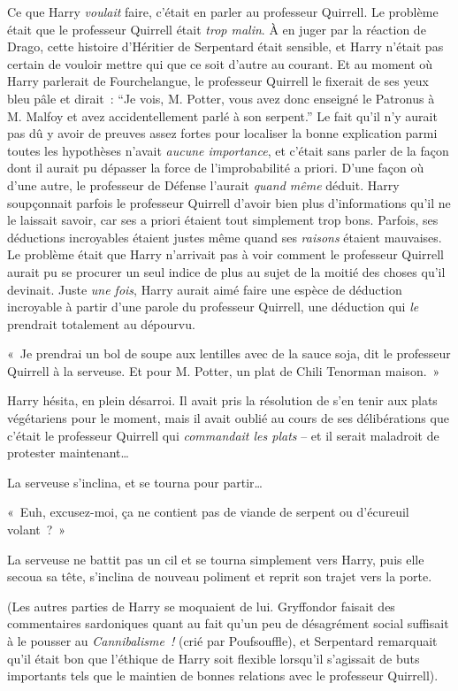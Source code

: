 Ce que Harry \emph{voulait} faire, c'était en parler au professeur Quirrell. Le problème était que le professeur Quirrell était \emph{trop malin}. À en juger par la réaction de Drago, cette histoire d'Héritier de Serpentard était sensible, et Harry n'était pas certain de vouloir mettre qui que ce soit d'autre au courant. Et au moment où Harry parlerait de Fourchelangue, le professeur Quirrell le fixerait de ses yeux bleu pâle et dirait~: “Je vois, M. Potter, vous avez donc enseigné le Patronus à M. Malfoy et avez accidentellement parlé à son serpent.”
Le fait qu'il n'y aurait pas dû y avoir de preuves assez fortes pour localiser la bonne explication parmi toutes les hypothèses n'avait \emph{aucune importance}, et c'était sans parler de la façon dont il aurait pu dépasser la force de l'improbabilité a priori. D'une façon où d'une autre, le professeur de Défense l'aurait \emph{quand même} déduit. Harry soupçonnait parfois le professeur Quirrell d'avoir bien plus d'informations qu'il ne le laissait savoir, car ses a priori étaient tout simplement trop bons. Parfois, ses déductions incroyables étaient justes même quand ses \emph{raisons} étaient mauvaises. Le problème était que Harry n'arrivait pas à voir comment le professeur Quirrell aurait pu se procurer un seul indice de plus au sujet de la moitié des choses qu'il devinait. Juste \emph{une fois}, Harry aurait aimé faire une espèce de déduction incroyable à partir d'une parole du professeur Quirrell, une déduction qui \emph{le} prendrait totalement au dépourvu.

\later

«~Je prendrai un bol de soupe aux lentilles avec de la sauce soja, dit le professeur Quirrell à la serveuse. Et pour M. Potter, un plat de Chili Tenorman maison.~»

Harry hésita, en plein désarroi. Il avait pris la résolution de s'en tenir aux plats végétariens pour le moment, mais il avait oublié au cours de ses délibérations que c'était le professeur Quirrell qui \emph{commandait les plats} -- et il serait maladroit de protester maintenant…

La serveuse s'inclina, et se tourna pour partir…

«~Euh, excusez-moi, ça ne contient pas de viande de serpent ou d'écureuil volant~?~»

La serveuse ne battit pas un cil et se tourna simplement vers Harry, puis elle secoua sa tête, s'inclina de nouveau poliment et reprit son trajet vers la porte.

(Les autres parties de Harry se moquaient de lui. Gryffondor faisait des commentaires sardoniques quant au fait qu'un peu de désagrément social suffisait à le pousser au \emph{Cannibalisme~!} (crié par Poufsouffle), et Serpentard remarquait qu'il était bon que l'éthique de Harry soit flexible lorsqu'il s'agissait de buts importants tels que le maintien de bonnes relations avec le professeur Quirrell).

